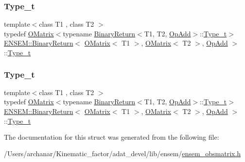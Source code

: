 \subsubsection{\texorpdfstring{Type\_t}{Type\_t}\hspace{0.1cm}{\footnotesize\ttfamily [1/2]}}
{\footnotesize\ttfamily template$<$class T1 , class T2 $>$ \\
typedef \mbox{\hyperlink{classENSEM_1_1OMatrix}{O\+Matrix}}$<$typename \mbox{\hyperlink{structENSEM_1_1BinaryReturn}{Binary\+Return}}$<$T1, T2, \mbox{\hyperlink{structENSEM_1_1OpAdd}{Op\+Add}}$>$\+::\mbox{\hyperlink{structENSEM_1_1BinaryReturn_3_01OMatrix_3_01T1_01_4_00_01OMatrix_3_01T2_01_4_00_01OpAdd_01_4_a7de7198d32f38f8553233464ed23acd4}{Type\+\_\+t}}$>$ \mbox{\hyperlink{structENSEM_1_1BinaryReturn}{E\+N\+S\+E\+M\+::\+Binary\+Return}}$<$ \mbox{\hyperlink{classENSEM_1_1OMatrix}{O\+Matrix}}$<$ T1 $>$, \mbox{\hyperlink{classENSEM_1_1OMatrix}{O\+Matrix}}$<$ T2 $>$, \mbox{\hyperlink{structENSEM_1_1OpAdd}{Op\+Add}} $>$\+::\mbox{\hyperlink{structENSEM_1_1BinaryReturn_3_01OMatrix_3_01T1_01_4_00_01OMatrix_3_01T2_01_4_00_01OpAdd_01_4_a7de7198d32f38f8553233464ed23acd4}{Type\+\_\+t}}}

\mbox{\label{structENSEM_1_1BinaryReturn_3_01OMatrix_3_01T1_01_4_00_01OMatrix_3_01T2_01_4_00_01OpAdd_01_4_a7de7198d32f38f8553233464ed23acd4}} 
\subsubsection{\texorpdfstring{Type\_t}{Type\_t}\hspace{0.1cm}{\footnotesize\ttfamily [2/2]}}
{\footnotesize\ttfamily template$<$class T1 , class T2 $>$ \\
typedef \mbox{\hyperlink{classENSEM_1_1OMatrix}{O\+Matrix}}$<$typename \mbox{\hyperlink{structENSEM_1_1BinaryReturn}{Binary\+Return}}$<$T1, T2, \mbox{\hyperlink{structENSEM_1_1OpAdd}{Op\+Add}}$>$\+::\mbox{\hyperlink{structENSEM_1_1BinaryReturn_3_01OMatrix_3_01T1_01_4_00_01OMatrix_3_01T2_01_4_00_01OpAdd_01_4_a7de7198d32f38f8553233464ed23acd4}{Type\+\_\+t}}$>$ \mbox{\hyperlink{structENSEM_1_1BinaryReturn}{E\+N\+S\+E\+M\+::\+Binary\+Return}}$<$ \mbox{\hyperlink{classENSEM_1_1OMatrix}{O\+Matrix}}$<$ T1 $>$, \mbox{\hyperlink{classENSEM_1_1OMatrix}{O\+Matrix}}$<$ T2 $>$, \mbox{\hyperlink{structENSEM_1_1OpAdd}{Op\+Add}} $>$\+::\mbox{\hyperlink{structENSEM_1_1BinaryReturn_3_01OMatrix_3_01T1_01_4_00_01OMatrix_3_01T2_01_4_00_01OpAdd_01_4_a7de7198d32f38f8553233464ed23acd4}{Type\+\_\+t}}}



The documentation for this struct was generated from the following file\+:\begin{DoxyCompactItemize}
\item 
/\+Users/archanar/\+Kinematic\+\_\+factor/adat\+\_\+devel/lib/ensem/\mbox{\hyperlink{lib_2ensem_2ensem__obsmatrix_8h}{ensem\+\_\+obsmatrix.\+h}}\end{DoxyCompactItemize}
